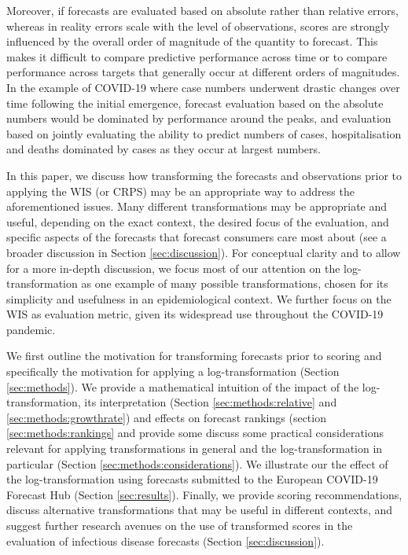 \documentclass{article}
\begin{document}
Moreover, if forecasts are evaluated based on absolute rather than relative errors, whereas in reality errors scale with the level of observations, scores are strongly influenced by the overall order of magnitude of the quantity to forecast.
This makes it difficult to compare predictive performance across time or to compare performance across targets that generally occur at different orders of magnitudes.
In the example of COVID-19 where case numbers underwent drastic changes over time following the initial emergence, forecast evaluation based on the absolute numbers would be dominated by performance around the peaks, and evaluation based on jointly evaluating the ability to predict numbers of cases, hospitalisation and deaths dominated by cases as they occur at largest numbers.

In this paper, we discuss how transforming the forecasts and observations prior to applying the WIS (or CRPS) may be an appropriate way to address the aforementioned issues. Many different transformations may be appropriate and useful, depending on the exact context, the desired focus of the evaluation, and specific aspects of the forecasts that forecast consumers care most about (see a broader discussion in Section \ref{sec:discussion}). For conceptual clarity and to allow for a more in-depth discussion, we focus most of our attention on the log-transformation as one example of many possible transformations, chosen for its simplicity and usefulness in an epidemiological context. We further focus on the WIS as evaluation metric, given its widespread use throughout the COVID-19 pandemic. 

We first outline the motivation for transforming forecasts prior to scoring and specifically the motivation for applying a log-transformation (Section \ref{sec:methods}). We provide a mathematical intuition of the impact of the log-transformation, its interpretation (Section \ref{sec:methods:relative} and \ref{sec:methods:growthrate}) and effects on forecast rankings (section \ref{sec:methods:rankings} and provide some discuss some practical considerations relevant for applying transformations in general and the log-transformation in particular (Section \ref{sec:methods:considerations}). We illustrate our the effect of the log-transformation using forecasts submitted to the European COVID-19 Forecast Hub  \citep{europeancovid-19forecasthubEuropeanCovid19Forecast2021, sherrattPredictivePerformanceMultimodel2022} (Section \ref{sec:results}). Finally, we provide scoring recommendations, discuss alternative transformations that may be useful in different contexts, and suggest further research avenues on the use of transformed scores in the evaluation of infectious disease forecasts (Section \ref{sec:discussion}). 
\end{document}
